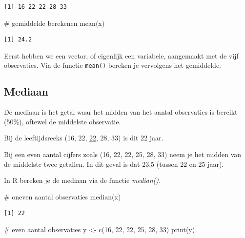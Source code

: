 \documentclass[
  letterpaper,
  DIV=11,
  numbers=noendperiod]{scrreprt}
\newenvironment{Shaded}{\begin{snugshade}}{\end{snugshade}}
\newcommand{\CommentTok}[1]{\textcolor[rgb]{0.37,0.37,0.37}{#1}}
\newcommand{\DecValTok}[1]{\textcolor[rgb]{0.68,0.00,0.00}{#1}}
\newcommand{\FunctionTok}[1]{\textcolor[rgb]{0.28,0.35,0.67}{#1}}
\newcommand{\NormalTok}[1]{\textcolor[rgb]{0.00,0.23,0.31}{#1}}
\newcommand{\OtherTok}[1]{\textcolor[rgb]{0.00,0.23,0.31}{#1}}
\begin{document}
\begin{verbatim}
[1] 16 22 22 28 33
\end{verbatim}

\begin{Shaded}
\begin{Highlighting}[]
\CommentTok{\# gemiddelde berekenen}
\FunctionTok{mean}\NormalTok{(x)}
\end{Highlighting}
\end{Shaded}

\begin{verbatim}
[1] 24.2
\end{verbatim}

Eerst hebben we een vector, of eigenlijk een variabele, aangemaakt met
de vijf observaties. Via de functie \texttt{mean()} bereken je
vervolgens het gemiddelde.

\subsection{Mediaan}\label{mediaan}

De mediaan is het getal waar het midden van het aantal observaties is
bereikt (50\%), oftewel de middelste observatie.

Bij de leeftijdsreeks (16, 22, \ul{22}, 28, 33) is dit 22 jaar.

Bij een even aantal cijfers zoals (16, 22, 22, 25, 28, 33) neem je het
midden van de middelste twee getallen. In dit geval is dat 23,5 (tussen
22 en 25 jaar).

In R bereken je de mediaan via de functie \emph{median().}

\begin{Shaded}
\begin{Highlighting}[]
\CommentTok{\# oneven aantal observaties}
\FunctionTok{median}\NormalTok{(x)}
\end{Highlighting}
\end{Shaded}

\begin{verbatim}
[1] 22
\end{verbatim}

\begin{Shaded}
\begin{Highlighting}[]
\CommentTok{\# even aantal observaties}
\NormalTok{y }\OtherTok{\textless{}{-}} \FunctionTok{c}\NormalTok{(}\DecValTok{16}\NormalTok{, }\DecValTok{22}\NormalTok{, }\DecValTok{22}\NormalTok{, }\DecValTok{25}\NormalTok{, }\DecValTok{28}\NormalTok{, }\DecValTok{33}\NormalTok{)}
\FunctionTok{print}\NormalTok{(y)}
\end{Highlighting}
\end{Shaded}
\end{document}
